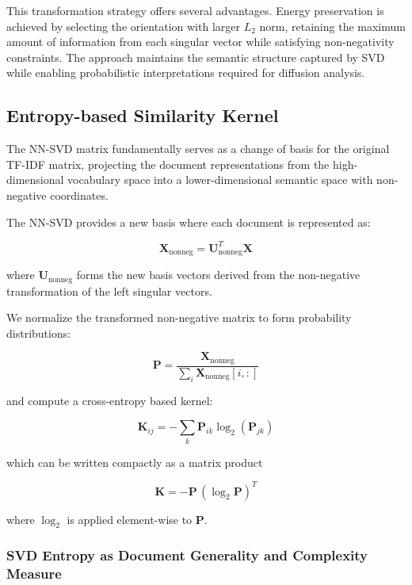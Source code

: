 \documentclass[12pt,a4paper]{article}
\begin{document}
This transformation strategy offers several advantages. Energy preservation is achieved by selecting the orientation with larger $L_2$ norm, retaining the maximum amount of information from each singular vector while satisfying non-negativity constraints. The approach maintains the semantic structure captured by SVD while enabling probabilistic interpretations required for diffusion analysis.

\subsection{Entropy-based Similarity Kernel}
The NN-SVD matrix fundamentally serves as a change of basis for the original TF-IDF matrix, projecting the document representations from the high-dimensional vocabulary space into a lower-dimensional semantic space with non-negative coordinates.

The NN-SVD provides a new basis where each document is represented as:

\begin{equation}
\mathbf{X}_{\text{nonneg}} = \mathbf{U}_{\text{nonneg}}^T \mathbf{X}
\end{equation}

where $\mathbf{U}_{\text{nonneg}}$ forms the new basis vectors derived from the non-negative transformation of the left singular vectors.

We normalize the transformed non-negative matrix to form probability distributions:

\begin{equation}
\mathbf{P} = \frac{\mathbf{X}_{\text{nonneg}}}{\sum_{i} \mathbf{X}_{\text{nonneg}}[i,:]}
\end{equation}

and compute a cross-entropy based kernel:

\begin{equation}
\mathbf{K}_{ij} = -\sum_{k} \mathbf{P}_{ik} \log_2(\mathbf{P}_{jk})
\end{equation}

which can be written compactly as a matrix product

\begin{equation}
\mathbf{K} = -\mathbf{P}\,(\log_2 \mathbf{P})^T
\end{equation}

where $\log_2$ is applied element-wise to $\mathbf{P}$.

\subsubsection{SVD Entropy as Document Generality and Complexity Measure}
\end{document}

